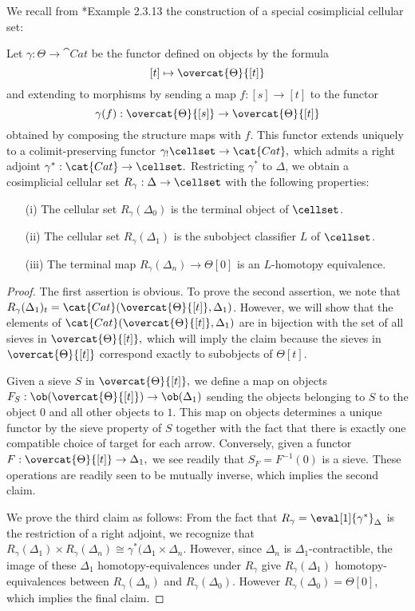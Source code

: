 We recall from \cite{cisinski-book}*{Example 2.3.13} the construction of a special cosimplicial cellular set:
\begin{lemma} Let \(\gamma: \Theta\to \cat{Cat}\) be the functor defined on objects by the formula \[[t]\mapsto \overcat{\Theta}{[t]}\] and extending to morphisms by sending a map \(f:[s]\to [t]\) to the functor \[\gamma(f):\overcat{\Theta}{[s]}\to \overcat{\Theta}{[t]}\] obtained by composing the structure maps with \(f\). This functor extends uniquely to a colimit-preserving functor \(\gamma_!\cellset \to \cat{Cat},\) which admits a right adjoint \(\gamma^\ast:\cat{Cat}\to \cellset.\)  Restricting \(\gamma^\ast\) to \(\Delta\), we obtain a cosimplicial cellular set \(R_\gamma:\Delta\to \cellset\) with the following properties:
\begin{enumerate}
\item [(i)] The cellular set \(R_\gamma(\Delta_0)\) is the terminal object of \(\cellset\).
\item [(ii)] The cellular set \(R_\gamma(\Delta_1)\) is the subobject classifier \(L\) of \(\cellset\).
\item [(iii)] The terminal map \(R_\gamma(\Delta_n)\to \Theta[0]\) is an \(L\)-homotopy equivalence.
\end{enumerate}   
\end{lemma}
\begin{proof} The first assertion is obvious.  To prove the second assertion, we note that \(R_\gamma(\Delta_1)_t=\cat{Cat}(\overcat{\Theta}{[t]},\Delta_1)\).  However, we will show that the elements of \(\cat{Cat}(\overcat{\Theta}{[t]},\Delta_1)\) are in bijection with the set of all sieves in \(\overcat{\Theta}{[t]},\) which will imply the claim because the sieves in \(\overcat{\Theta}{[t]}\) correspond exactly to subobjects of \(\Theta[t]\).  

Given a sieve \(S\) in \(\overcat{\Theta}{[t]},\) we define a map on objects \(F_S:\ob(\overcat{\Theta}{[t]}) \to \ob(\Delta_1)\) sending the objects belonging to \(S\) to the object \(0\) and all other objects to \(1\).  This map on objects determines a unique functor by the sieve property of \(S\) together with the fact that there is exactly one compatible choice of target for each arrow.  Conversely, given a functor \(F:\overcat{\Theta}{[t]} \to \Delta_1,\) we see readily that \(S_F=F^{-1}(0)\) is a sieve.  These operations are readily seen to be mutually inverse, which implies the second claim.

We prove the third claim as follows: From the fact that \(R_\gamma=\eval[1]{\gamma^\ast}_{\Delta}\) is the restriction of a right adjoint, we recognize that \(R_\gamma(\Delta_1)\times R_\gamma(\Delta_n)\cong \gamma^\ast(\Delta_1\times \Delta_n\).  However, since \(\Delta_n\) is \(\Delta_1\)-contractible, the image of these \(\Delta_1\) homotopy-equivalences under \(R_\gamma\) give \(R_\gamma(\Delta_1)\) homotopy-equivalences between \(R_\gamma(\Delta_n)\) and \(R_\gamma(\Delta_0)\).  However \(R_\gamma(\Delta_0)=\Theta[0]\), which implies the final claim.
\end{proof}
